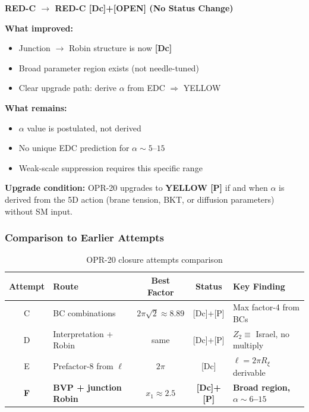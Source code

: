 \begin{tcolorbox}[
    colback=red!5!white,
    colframe=red!60!black,
    title=\textbf{OPR-20 Attempt F: Stoplight Verdict}
]
\begin{center}
\textbf{\large RED-C $\to$ RED-C [Dc]+[OPEN] (No Status Change)}
\end{center}

\medskip
\textbf{What improved:}
\begin{itemize}[nosep]
    \item Junction $\to$ Robin structure is now \textbf{[Dc]}
    \item Broad parameter region exists (not needle-tuned)
    \item Clear upgrade path: derive $\alpha$ from EDC $\Rightarrow$ YELLOW
\end{itemize}

\textbf{What remains:}
\begin{itemize}[nosep]
    \item $\alpha$ value is postulated, not derived
    \item No unique EDC prediction for $\alpha \sim 5$--$15$
    \item Weak-scale suppression requires this specific range
\end{itemize}

\textbf{Upgrade condition:}
OPR-20 upgrades to \textbf{YELLOW [P]} if and when $\alpha$ is derived from the
5D action (brane tension, BKT, or diffusion parameters) without SM input.
\end{tcolorbox}

\subsubsection{Comparison to Earlier Attempts}
\label{sec:attemptF_comparison}

\begin{table}[ht]
\centering
\caption{OPR-20 closure attempts comparison}
\label{tab:attemptF_comparison}
\small
\begin{tabular}{clccl}
\toprule
\textbf{Attempt} & \textbf{Route} & \textbf{Best Factor} & \textbf{Status} & \textbf{Key Finding} \\
\midrule
C & BC combinations & $2\pi\sqrt{2} \approx 8.89$ & [Dc]+[P] & Max factor-4 from BCs \\
D & Interpretation + Robin & same & [Dc]+[P] & $Z_2 \equiv$ Israel, no multiply \\
E & Prefactor-8 from $\ell$ & $2\pi$ & [Dc] & $\ell = 2\pi R_\xi$ derivable \\
\textbf{F} & \textbf{BVP + junction Robin} & \textbf{$x_1 \approx 2.5$} & \textbf{[Dc]+[P]} & \textbf{Broad region, $\alpha \sim 6$--$15$} \\
\bottomrule
\end{tabular}
\end{table}

